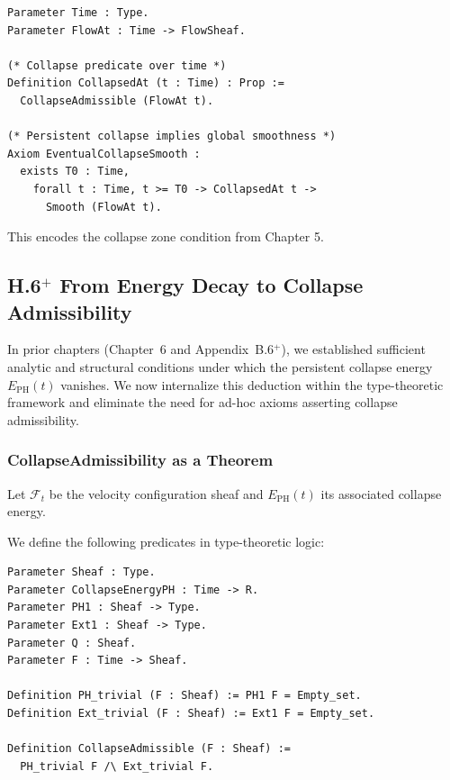 \documentclass[11pt]{article}
\begin{document}
\begin{lstlisting}[language=Coq, caption=Time-Indexed Collapse]
Parameter Time : Type.
Parameter FlowAt : Time -> FlowSheaf.

(* Collapse predicate over time *)
Definition CollapsedAt (t : Time) : Prop :=
  CollapseAdmissible (FlowAt t).

(* Persistent collapse implies global smoothness *)
Axiom EventualCollapseSmooth :
  exists T0 : Time,
    forall t : Time, t >= T0 -> CollapsedAt t ->
      Smooth (FlowAt t).
\end{lstlisting}

This encodes the collapse zone condition from Chapter 5.

\subsection{H.6$^{+}$ From Energy Decay to Collapse Admissibility}
\label{sec:type-collapse-energy-to-admissibility}

In prior chapters (Chapter~6 and Appendix~B.6$^{+}$), we established sufficient analytic and structural conditions under which the persistent collapse energy \( E_{\mathrm{PH}}(t) \) vanishes. We now internalize this deduction within the type-theoretic framework and eliminate the need for ad-hoc axioms asserting collapse admissibility.

\subsubsection*{CollapseAdmissibility as a Theorem}

Let \( \mathcal{F}_t \) be the velocity configuration sheaf and \( E_{\mathrm{PH}}(t) \) its associated collapse energy.

We define the following predicates in type-theoretic logic:

\begin{lstlisting}[language=Coq, caption={Collapse Energy and Triviality in Type Theory}]
Parameter Sheaf : Type.
Parameter CollapseEnergyPH : Time -> R.
Parameter PH1 : Sheaf -> Type.
Parameter Ext1 : Sheaf -> Type.
Parameter Q : Sheaf.
Parameter F : Time -> Sheaf.

Definition PH_trivial (F : Sheaf) := PH1 F = Empty_set.
Definition Ext_trivial (F : Sheaf) := Ext1 F = Empty_set.

Definition CollapseAdmissible (F : Sheaf) :=
  PH_trivial F /\ Ext_trivial F.
\end{lstlisting}
\end{document}
